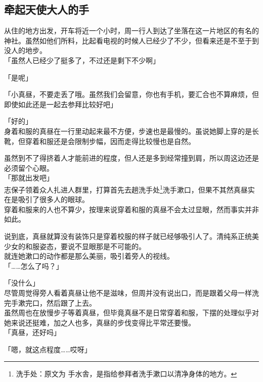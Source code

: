 \subsection{牵起天使大人的手}

从住的地方出发，开车将近一个小时，周一行人到达了坐落在这一片地区的有名的神社。虽然如他们所料，比起看电视的时候人已经少了不少，但看来还是不至于到没人的地步。\\

「虽然人已经少了挺多了，不过还是剩下不少啊」

「是呢」

「小真昼，不要走丢了哦。虽然我们会留意，你也有手机，要汇合也不算麻烦，但即使如此还是一起去参拜比较好吧」

「好的」\\

身着和服的真昼在一行里动起来最不方便，步速也是最慢的。虽说她脚上穿的是长靴，但穿着和服还是会限制步幅，因而走得比较慢也是自然。

虽然到不了得挤着人才能前进的程度，但人还是多到经常撞到肩，所以周这边还是必须留个心眼。\\

「那就出发吧」\\

志保子领着众人扎进人群里，打算首先去趟洗手处\footnote{洗手处：原文为 {\jpfont 手水舎}，是指给参拜者洗手漱口以清净身体的地方。}洗手漱口，但果不其然真昼实在是吸引了很多人的眼球。\\

穿着和服来的人也不算少，按理来说穿着和服的真昼不会太过显眼，然而事实并非如此。

说到底，真昼就算没有装饰只是穿着校服的样子就已经够吸引人了。清纯系正统美少女的和服姿态，要说不显眼那是不可能的。\\

就连她漱口的动作都是那么美丽，吸引着旁人的视线。\\

「……怎么了吗？」

「没什么」\\

尽管周觉得旁人看着真昼让他不是滋味，但周并没有说出口，而是跟着父母一样洗完手漱完口，然后跟了上去。\\

虽然周也在放慢步子等着真昼，但毕竟真昼不是日常穿着和服，下摆的处理似乎对她来说还挺难，加之人也多，真昼的步伐变得比平常还要慢。\\

「真昼，还好吗」

「嗯，就这点程度……哎呀」\\

